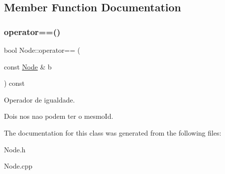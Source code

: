 \subsection{Member Function Documentation}
\hypertarget{class_node_a551edd0a6b25f77d410d018c41219855}{}\label{class_node_a551edd0a6b25f77d410d018c41219855} 
\subsubsection{\texorpdfstring{operator==()}{operator==()}}
{\footnotesize\ttfamily bool Node\+::operator== (\begin{DoxyParamCaption}\item[{const \hyperlink{class_node}{Node} \&}]{b }\end{DoxyParamCaption}) const}



Operador de igualdade. 

Dois nos nao podem ter o mesmo\+Id. 

The documentation for this class was generated from the following files\+:\begin{DoxyCompactItemize}
\item 
Node.\+h\item 
Node.\+cpp\end{DoxyCompactItemize}
